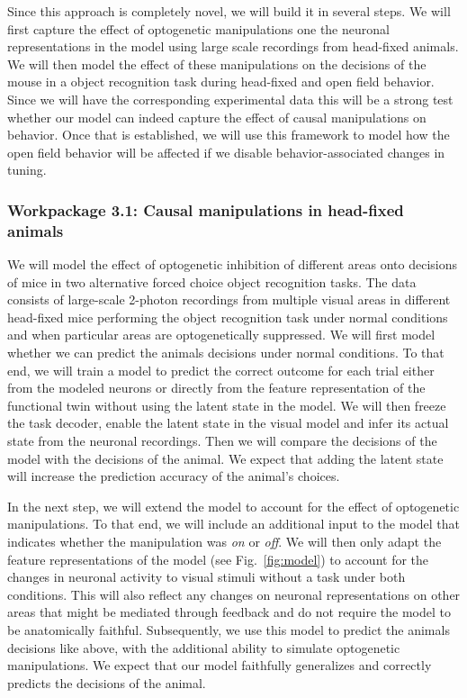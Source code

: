 \documentclass[B2,COG]{ercgrant}
\begin{document}
Since this approach is completely novel, we will build it in several steps. 
We will first capture the effect of optogenetic manipulations one the neuronal representations in the model using large scale recordings from head-fixed animals. 
We will then model the effect of these manipulations on the decisions of the mouse in a object recognition task during head-fixed and open field behavior. 
Since we will have the corresponding experimental data this will be a strong test whether our model can indeed capture the effect of causal manipulations on behavior.
Once that is established, we will use this framework to model how the open field behavior will be affected if we disable behavior-associated changes in tuning.

\subsubsection{Workpackage 3.1: Causal manipulations in head-fixed animals\hfill{}}
We will model the effect of optogenetic inhibition of different areas onto decisions of mice in two alternative forced choice object recognition tasks. 
The data consists of large-scale 2-photon recordings from multiple visual areas in different head-fixed mice performing the object recognition task under normal conditions and when particular areas are optogenetically suppressed.
We will first model whether we can predict the animals decisions under normal conditions. 
To that end, we will train a model to predict the correct outcome for each trial either from the modeled neurons or directly from the feature representation of the functional twin without using the  latent state in the model.
We will then freeze the task decoder, enable the latent state in the visual model and infer its actual state from the neuronal recordings. 
Then we will compare the decisions of the model with the decisions of the animal. 
We expect that adding the latent state will increase the prediction accuracy of the animal's choices. 

In the next step, we will extend the model to account for the effect of optogenetic manipulations. 
To that end, we will include an additional input to the model that indicates whether the manipulation was \textit{on} or \textit{off}. 
We will then only adapt the feature representations of the model (see Fig.~\ref{fig:model}) to account for the changes in neuronal activity to visual stimuli without a task under both conditions.
This will also reflect any changes on neuronal representations on other areas that might be mediated through feedback and do not require the model to be anatomically faithful. 
Subsequently, we use this model to predict the animals decisions like above, with the additional ability to simulate optogenetic manipulations.
We expect that our model faithfully generalizes and correctly predicts the decisions of the animal. 
\end{document}
